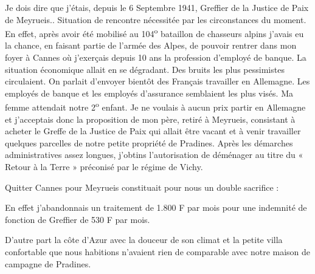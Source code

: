 Je dois dire que j’étais, depuis le 6 Septembre 1941, Greffier de la Justice de Paix de
Meyrueis.. Situation de rencontre nécessitée par les circonstances du moment. En effet, après
avoir été mobilisé au 104\textsuperscript{o} bataillon de chasseurs alpins j’avais eu la chance, en faisant partie
de l’armée des Alpes, de pouvoir rentrer dans mon foyer à Cannes où j’exerçais depuis 10 ans
la profession d’employé de banque. La situation économique allait en se dégradant. Des bruits
les plus pessimistes circulaient. On parlait d’envoyer bientôt des Français travailler en
Allemagne. Les employés de banque et les employés d’assurance semblaient les plus visés.
Ma femme attendait notre 2\textsuperscript{o} enfant. Je ne voulais à aucun prix partir en Allemagne et
j’acceptais donc la proposition de mon père, retiré à Meyrueis, consistant à acheter le Greffe
de la Justice de Paix qui allait être vacant et à venir travailler quelques parcelles de notre
petite propriété de Pradines. Après les démarches administratives assez longues, j’obtins
l’autorisation de déménager au titre du « Retour à la Terre » préconisé par le régime de
Vichy.

\vspace{0.45cm}

Quitter Cannes pour Meyrueis constituait pour nous un double sacrifice :

En effet j’abandonnais un traitement de 1.800 F par mois pour une indemnité de fonction de
Greffier de 530 F par mois.

D’autre part la côte d’Azur avec la douceur de son climat et la petite villa confortable que
nous habitions n’avaient rien de comparable avec notre maison de campagne de Pradines.

\clearpage
